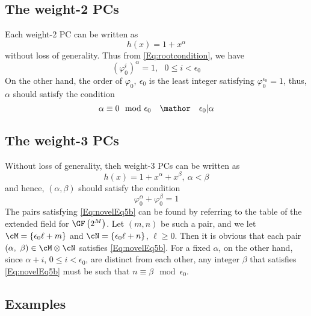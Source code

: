 \subsection{The weight-2 PCs}
\label{sec:PC2}
Each weight-2 PC can be written as 
\begin{equation}
h(x)=1+x^{\alpha}
\label{eq:wt2-gen-form}
\end{equation}
without loss of generality. Thus from \eqref{Eq:rootcondition}, we have 
\begin{equation}
(\varphi_0^i)^{\alpha} =1,~~~ 0 \leq i < \epsilon_0
\label{novelEq5b}
\end{equation}
On the other hand, the order of $\varphi_0,~\epsilon_0$ is the least integer satisfying $\varphi_0^{\epsilon_0} = 1$, thus, $\alpha$ should satisfy the condition
\begin{equation}
\alpha \equiv 0 \mod \epsilon_0~~~\mathor~~~\epsilon_0|\alpha
\label{eq:wt2-alpha}
\end{equation}

\subsection{The weight-3 PCs}

Without loss of generality, theh weight-3 PCs can be written as 
\begin{equation}
h(x)=1+x^{\alpha}+x^{\beta},~\alpha < \beta
\label{novelEqwt3}
\end{equation}
and hence, $(\alpha,\beta)$ should satisfy the condition
\begin{equation}
\varphi_0^{\alpha}+\varphi_0^{\beta}= 1
\label{Eq:novelEq5b}
\end{equation}
The pairs satisfying \eqref{Eq:novelEq5b} can be found by referring to the table of the extended field for $\GF\left(2^M\right)$. 
Let $(m,n)$ be such a pair, and we let $\cM=\{\epsilon_0 \ell+m\}$ and $\cN=\{\epsilon_0 \ell+n\}$, $\ell \geq 0$. Then it is obvious that each pair $(\alpha,~\beta) \in \cM \otimes \cN$ satisfies
\eqref{Eq:novelEq5b}. For a fixed $\alpha$, on the other hand, since $\alpha+i$, $0 \leq i < \epsilon_0$, are distinct from each other, any integer $\beta$ that satisfies \eqref{Eq:novelEq5b} must be such that $n\equiv \beta \mod \epsilon_0$.

\subsection{Examples}

